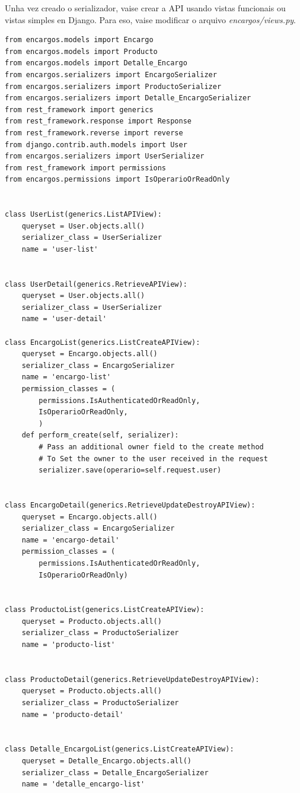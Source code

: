 \documentclass[11pt,twoside]{book}
\begin{document}
Unha vez creado o serializador, vaise crear a API usando vistas funcionais ou vistas simples en Django. Para eso, vaise modificar o arquivo \textit{encargos/views.py}.

\begin{verbatim}
from encargos.models import Encargo
from encargos.models import Producto
from encargos.models import Detalle_Encargo
from encargos.serializers import EncargoSerializer
from encargos.serializers import ProductoSerializer
from encargos.serializers import Detalle_EncargoSerializer
from rest_framework import generics
from rest_framework.response import Response
from rest_framework.reverse import reverse
from django.contrib.auth.models import User
from encargos.serializers import UserSerializer
from rest_framework import permissions
from encargos.permissions import IsOperarioOrReadOnly


class UserList(generics.ListAPIView):
    queryset = User.objects.all()
    serializer_class = UserSerializer
    name = 'user-list'


class UserDetail(generics.RetrieveAPIView):
    queryset = User.objects.all()
    serializer_class = UserSerializer
    name = 'user-detail'

class EncargoList(generics.ListCreateAPIView):
    queryset = Encargo.objects.all()
    serializer_class = EncargoSerializer
    name = 'encargo-list'
    permission_classes = (
        permissions.IsAuthenticatedOrReadOnly,
        IsOperarioOrReadOnly,
        )
    def perform_create(self, serializer):
        # Pass an additional owner field to the create method
        # To Set the owner to the user received in the request
        serializer.save(operario=self.request.user)


class EncargoDetail(generics.RetrieveUpdateDestroyAPIView):
    queryset = Encargo.objects.all()
    serializer_class = EncargoSerializer
    name = 'encargo-detail'
    permission_classes = (
        permissions.IsAuthenticatedOrReadOnly,
        IsOperarioOrReadOnly)


class ProductoList(generics.ListCreateAPIView):
    queryset = Producto.objects.all()
    serializer_class = ProductoSerializer
    name = 'producto-list'


class ProductoDetail(generics.RetrieveUpdateDestroyAPIView):
    queryset = Producto.objects.all()
    serializer_class = ProductoSerializer
    name = 'producto-detail'
    

class Detalle_EncargoList(generics.ListCreateAPIView):
    queryset = Detalle_Encargo.objects.all()
    serializer_class = Detalle_EncargoSerializer
    name = 'detalle_encargo-list'



\end{verbatim}
\end{document}
